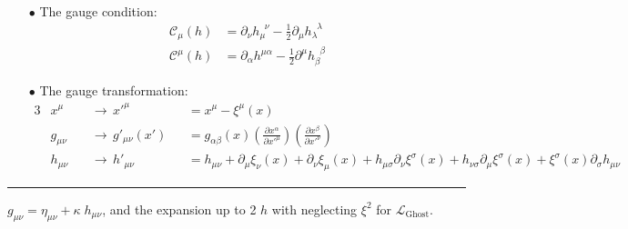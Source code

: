 \documentclass[aspectratio=169,usenames,dvipsnames]{beamer}
\begin{document}
\begin{frame}[t]{\centering {}\\
    {\centering{}}  } \footnotesize
{}
\vspace{4mm}
\begin{itemize}
\item[$\bullet$] The gauge condition: 
\begin{align*}
  \mathcal{C}_{\mu}(h) &= \partial_{\nu} h_{\mu}^{\;\;\nu} - \frac{1}{2} \partial_{\mu} h_{\lambda}^{\;\;\lambda} \\[2mm]
  \mathcal{C}^{\mu}(h) &= \partial_{\alpha} h^{\mu\alpha} - \frac{1}{2} \partial^{\mu} h_{\beta}^{\;\;\beta}
\end{align*}
\item[$\bullet$] The gauge transformation:
\begin{alignat*}{3}
  &x^{\mu} \, && \rightarrow \, x'^{\mu} && = x^{\mu} - \xi^{\mu}(x)\\[2mm]
  &g_{\mu\nu} \, && \rightarrow \, g'_{\mu\nu}(x') && = g_{\alpha\beta}(x) (\frac{\partial x^{\alpha}}{\partial x'^{\mu}}) (\frac{\partial x^{\beta}}{\partial x'^{\nu}}) \\[2mm]
  &h_{\mu\nu} \, && \rightarrow \, h'_{\mu\nu} && = h_{\mu\nu} + \partial_{\mu} \xi_{\nu}(x) + \partial_{\nu} \xi_{\mu}(x) + h_{\mu\sigma} \partial_{\nu} \xi^{\sigma}(x) + h_{\nu\sigma} \partial_{\mu} \xi^{\sigma}(x) +  \xi^{\sigma}(x)  \partial_{\sigma} h_{\mu\nu}
\end{alignat*}
\end{itemize}
\vspace{9mm}
\textcolor{LUCopper}{\rule{\textwidth}{1pt}}
\tiny $g_{\mu\nu}=   \eta_{\mu\nu} +  \kappa \; h_{\mu \nu}$, and the expansion up to 2 $h$ with
  neglecting $\xi^2$ for $\mathcal{L}_{\text{Ghost}}$.
\vspace{100mm} 
\end{frame}
\end{document}

